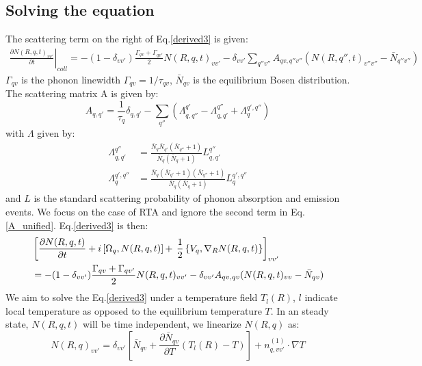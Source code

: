 \documentclass{article}
\begin{document}
\subsection{Solving the equation}
The scattering term on the right of Eq.\ref{derived3} is given:
\begin{align}
    \left. \frac{\partial N(R,q,t)_{vv'} }{\partial t} \right|_{coll} 
    = - (1-\delta_{vv'}) \frac{\Gamma_{qv} + \Gamma_{qv'}}{2} N(R,q,t)_{vv'} 
      - \delta_{vv'} \sum_{q''v''} A_{qv,q''v''}  (N(R,q'',t)_{v''v''} - \bar{N}_{q''v''} )
\end{align}
$\Gamma_{qv}$ is the phonon linewidth $\Gamma_{qv} = 1 / \tau_{qv}$, 
$\bar{N}_{qv}$ is the equilibrium Bosen distribution. The scattering matrix A is given by:
\begin{equation}
    A_{q,q'} = \frac{1}{\tau_{q}} \delta_{q,q'} 
            - \sum_{q''} \left( \Lambda_{q,q''}^{q'} -  \Lambda_{q,q'}^{q''} + \Lambda^{q',q''}_{q} \right) \label{A_unified}
\end{equation}
with $\Lambda$ given by:
\begin{align}
    \Lambda_{q,q'}^{q''} &= \frac{\bar{N}_{q} \bar{N}_{q'} (\bar{N}_{q''} + 1)}{\bar{N}_{q} (\bar{N}_{q} + 1)} L_{q,q'}^{q''} \\
    \Lambda^{q',q''}_{q} &= \frac{\bar{N}_{q} (\bar{N}_{q'}+1) (\bar{N}_{q''} + 1)}{\bar{N}_{q} (\bar{N}_{q} + 1)} L^{q',q''}_{q} 
\end{align}
and $L$ is the standard scattering probability of phonon absorption and emission events.
We focus on the case of RTA and ignore the second term in Eq.\ref{A_unified}. Eq.\ref{derived3} is then:
\begin{align}
    &\left[ \frac{\partial N(R,q,t)}{\partial t} + i \left[ \Omega_{q},N(R,q,t) \right] + \right.
      \left.  \frac{1}{2} \left\{ V_{q}, \nabla_R N(R,q,t) \right\} \right]_{vv'} \notag \\
        &=  - (1-\delta_{vv'}) \frac{\Gamma_{qv} + \Gamma_{qv'}}{2} N(R,q,t)_{vv'} 
           - \delta_{vv'} A_{qv,qv} (N(R,q,t)_{vv} - \bar{N}_{qv} ) \label{final}
\end{align}
We aim to solve the Eq.\ref{derived3} under a temperature field $T_l(R)$, $l$ indicate local temperature 
as opposed to the equilibrium temperature $T$. In an steady state, $N(R,q,t)$ will be time independent, we 
linearize $N(R,q)$ as:
\begin{equation}
    N(R,q)_{vv'} = \delta_{vv'} \left[ \bar{N}_{qv} + \frac{\partial \bar{N}_{qv}}{\partial T} (T_l(R)-T) \right] + n^{(1)}_{q,vv'} \cdot \nabla T \label{linear}
\end{equation}
\end{document}
